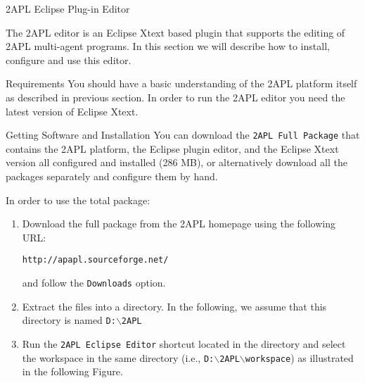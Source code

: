 \begin{section}{2APL Eclipse Plug-in Editor} \label{chap:eclipse}

The 2APL editor is an Eclipse Xtext based plugin that supports the
editing of 2APL multi-agent programs. In this section we will
describe how to install, configure and use this editor.

\begin{section}{Requirements}
You should have a basic understanding of the 2APL platform itself as
described in previous section. In order to run the 2APL editor you
need the latest version of Eclipse Xtext.
\end{section}

\begin{section}{Getting Software and Installation}
You can download the {\tt 2APL Full Package} that contains the 2APL
platform, the Eclipse plug\-in editor, and the Eclipse Xtext version
all configured and installed (286 MB), or alternatively download all
the packages separately and configure them by hand.


In order to use the total package:
\begin{enumerate}

    \item Download the full package from the 2APL homepage using the
    following URL:
    \begin{center}
    {\tt http://apapl.sourceforge.net/}
    \end{center}
    and follow the {\tt Downloads} option.

    \item Extract the files into a directory. In the following, we assume that this directory is named \texttt{D:$\backslash$2APL}

    \item Run the \texttt{2APL Eclipse Editor} shortcut located in the
    directory and select the workspace in the same directory (i.e.,
    \texttt{D:$\backslash$2APL$\backslash$workspace}) as illustrated in the following
    Figure.
        \begin{figure}[ht]
            \begin{center}
            \end{center}\label{fig:workspace}
        \end{figure}
\end{enumerate}


\end{section}
\end{section}

